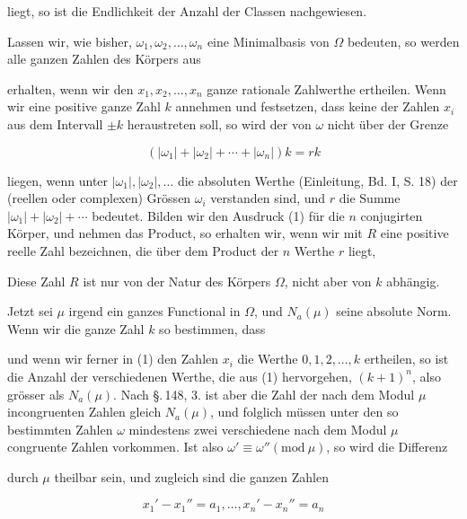 liegt, so ist die Endlichkeit der Anzahl der Classen nachgewiesen.

Lassen wir, wie bisher, $\omega_1, \omega_2, \ldots, \omega_n$ eine Minimalbasis von $\Omega$ bedeuten, so werden alle ganzen Zahlen des Körpers aus


erhalten, wenn wir den $x_1, x_2, \ldots, x_n$ ganze rationale Zahlwerthe ertheilen. Wenn wir eine positive ganze Zahl $k$ annehmen und festsetzen, dass keine der Zahlen $x_i$ aus dem Intervall $\pm k$ heraustreten soll, so wird der  von $\omega$ nicht über der Grenze

\[
(|\omega_1| + |\omega_2| + \cdots + |\omega_n|) k = rk
\]

liegen, wenn unter $|\omega_1|, |\omega_2|, \ldots$ die absoluten Werthe (Einleitung, Bd. I, S. 18) der (reellen oder complexen) Grössen $\omega_i$ verstanden sind, und $r$ die Summe $|\omega_1| + |\omega_2| + \cdots$ bedeutet. Bilden wir den Ausdruck (1) für die $n$ conjugirten Körper, und nehmen das Product, so erhalten wir, wenn wir mit $R$ eine positive reelle Zahl bezeichnen, die über dem Product der $n$ Werthe $r$ liegt,


Diese Zahl $R$ ist nur von der Natur des Körpers $\Omega$, nicht aber von $k$ abhängig.

Jetzt sei $\mu$ irgend ein ganzes Functional in $\Omega$, und $N_a(\mu)$ seine absolute Norm. Wenn wir die ganze Zahl $k$ so bestimmen, dass


und wenn wir ferner in (1) den Zahlen $x_i$ die Werthe $0, 1, 2, \ldots, k$ ertheilen, so ist die Anzahl der verschiedenen Werthe, die aus (1) hervorgehen, $(k+1)^n$, also grösser als $N_a(\mu)$. Nach \S.\,148, 3. ist aber die Zahl der nach dem Modul $\mu$ incongruenten Zahlen gleich $N_a(\mu)$, und folglich müssen unter den so bestimmten Zahlen $\omega$ mindestens zwei verschiedene nach dem Modul $\mu$ congruente Zahlen vorkommen. Ist also $\omega' \equiv \omega'' (\mathrm{mod}\ \mu)$, so wird die Differenz


durch $\mu$ theilbar sein, und zugleich sind die ganzen Zahlen

\[
x_1' - x_1'' = a_1, \ldots, x_n' - x_n'' = a_n
\]
